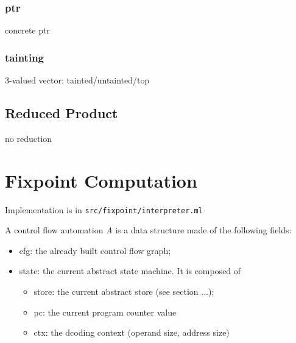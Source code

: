 \documentclass{report}
\begin{document}
\subsection{ptr}
concrete ptr
\subsection{tainting}
3-valued vector: tainted/untainted/top

\section{Reduced Product}
no reduction

\chapter{Fixpoint Computation}
Implementation is in \verb|src/fixpoint/interpreter.ml|

A control flow automation \emph{A} is a data structure made of the following fields:
\begin{itemize}
\item cfg: the already built control flow graph;
\item state: the current abstract state machine. It is composed of 
  \begin{itemize}
  \item store: the current abstract store  (see
  section ...);
\item pc: the current program counter value
\item ctx: the dcoding context (operand size, address size)
\end{itemize}
\end{itemize}
\end{document}

